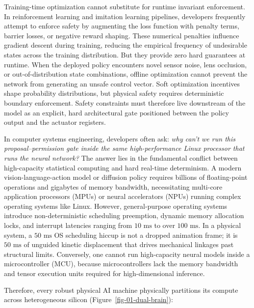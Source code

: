 \documentclass[
  10pt,
  letterpaper,
  twoside,
  openright,
  numbers=noenddot,
  headings=standardclasses
]{scrbook}
\begin{document}
Training-time optimization cannot substitute for runtime invariant
enforcement. In reinforcement learning and imitation learning pipelines,
developers frequently attempt to enforce safety by augmenting the loss
function with penalty terms, barrier losses, or negative reward shaping.
These numerical penalties influence gradient descent during training,
reducing the empirical frequency of undesirable states across the
training distribution. But they provide zero hard guarantees at runtime.
When the deployed policy encounters novel sensor noise, lens occlusion,
or out-of-distribution state combinations, offline optimization cannot
prevent the network from generating an unsafe control vector. Soft
optimization incentives shape probability distributions, but physical
safety requires deterministic boundary enforcement. Safety constraints
must therefore live downstream of the model as an explicit, hard
architectural gate positioned between the policy output and the actuator
registers.

In computer systems engineering, developers often ask: \emph{why can't
we run this proposal--permission gate inside the same high-performance
Linux processor that runs the neural network?} The answer lies in the
fundamental conflict between high-capacity statistical computing and
hard real-time determinism. A modern vision-language-action model or
diffusion policy requires billions of floating-point operations and
gigabytes of memory bandwidth, necessitating multi-core application
processors (MPUs) or neural accelerators (NPUs) running complex
operating systems like Linux. However, general-purpose operating systems
introduce non-deterministic scheduling preemption, dynamic memory
allocation locks, and interrupt latencies ranging from \(10\text{ ms}\)
to over \(100\text{ ms}\). In a physical system, a \(50\text{ ms}\) OS
scheduling hiccup is not a dropped animation frame; it is
\(50\text{ ms}\) of unguided kinetic displacement that drives mechanical
linkages past structural limits. Conversely, one cannot run
high-capacity neural models inside a microcontroller (MCU), because
microcontrollers lack the memory bandwidth and tensor execution units
required for high-dimensional inference.

Therefore, every robust physical AI machine physically partitions its
compute across heterogeneous silicon (Figure~\ref{fig-01-dual-brain}):
\end{document}
